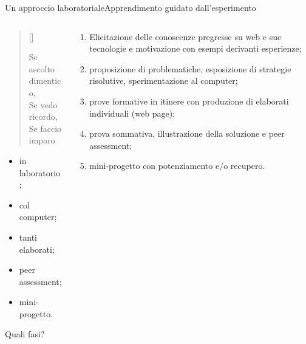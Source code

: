 \documentclass[italian]{beamer}
\begin{document}
\begin{frame}[fragile]{Un approccio laboratoriale}{Apprendimento guidato dall'esperimento}
	
	\begin{columns}
		\begin{column}{0.3\textwidth}
			
			\newcommand{\autore}[1]{%
				\nopagebreak{\raggedleft\footnotesize #1\par}}
				
			\settowidth{\versewidth}{Se ascolto dimentico,}
			{\color{green!50!black}	
			\begin{verse}[\versewidth]
			\begin{altverse}
				Se ascolto dimentico,\\
				Se vedo ricordo,\\
				Se faccio imparo\\
				\autore{Confucio}
			\end{altverse}
			\end{verse}
			}
			
			\vfill
			
			\begin{itemize}
				\item in laboratorio;
				\item col computer;
				\item tanti elaborati;
				\item peer assessment;
				\item mini-progetto.
			\end{itemize}
			
			Quali fasi?
						
		\end{column}
		
		\begin{column}{0.7\textwidth}
			
			\begin{enumerate}
				\item Elicitazione delle conoscenze pregresse su web e sue tecnologie e motivazione con esempi derivanti esperienze;
				
				\item proposizione di problematiche, esposizione di strategie risolutive, sperimentazione al computer;
				
				\item prove formative in itinere con produzione di elaborati individuali (web page);
				
				\item prova sommativa, illustrazione della soluzione e peer assessment;
				
				\item mini-progetto con potenziamento e/o recupero.
			\end{enumerate}			
			
		\end{column}
	\end{columns}

	\note{%
		
	}%
\end{frame}
\end{document}

